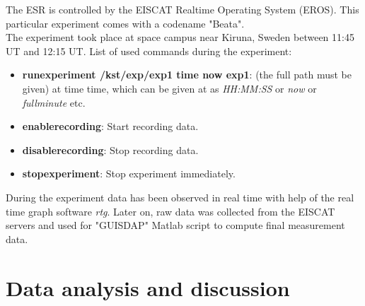 \documentclass{article}
\begin{document}
The ESR is controlled by the EISCAT Realtime Operating System (EROS). This particular experiment comes with a codename "Beata".\\
The experiment took place at space campus near Kiruna, Sweden between 11:45 UT and 12:15 UT.
List of used commands during the experiment:
\begin{itemize}
\item \textbf{runexperiment /kst/exp/exp1 time now exp1}: (the full path must be given) at time time, which can be given at as \emph{HH:MM:SS} or \emph{now} or \emph{fullminute} etc.
\item \textbf{enablerecording}: Start recording data.
\item \textbf{disablerecording}: Stop recording data.
\item \textbf{stopexperiment}: Stop experiment immediately.
\end{itemize}
During the experiment data has been observed in real time with help of the real time graph software \emph{rtg}. Later on, raw data was collected from the EISCAT servers and used for "GUISDAP" Matlab script to compute final measurement data.


\section{Data analysis and discussion}
\end{document}
